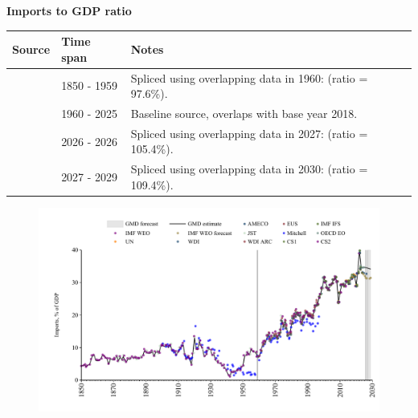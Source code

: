 \documentclass[12pt,a4paper,landscape]{article}
\begin{document}
\begin{adjustbox}{max totalsize={\paperwidth}{\paperheight},center}
\begin{minipage}[t][\textheight][t]{\textwidth}
\vspace*{0.5cm}
{}
\begin{center}
{\Large\bfseries Imports to GDP ratio}
\end{center}
\vspace{0.5cm}
\begin{table}[H]
\centering
\small
\begin{tabular}{|l|l|l|}
\hline
\textbf{Source} & \textbf{Time span} & \textbf{Notes} \\
\hline
\rowcolor{white}\cite{CS2_ESP}& 1850 - 1959 &Spliced using overlapping data in 1960: (ratio = 97.6\%). \\
\rowcolor{lightgray}\cite{OECD_EO}& 1960 - 2025 &Baseline source, overlaps with base year 2018. \\
\rowcolor{white}\cite{AMECO}& 2026 - 2026 &Spliced using overlapping data in 2027: (ratio = 105.4\%). \\
\rowcolor{lightgray}\cite{IMF_WEO_forecast}& 2027 - 2029 &Spliced using overlapping data in 2030: (ratio = 109.4\%). \\
\hline
\end{tabular}
\end{table}
\begin{figure}[H]
\centering
\includegraphics[width=\textwidth,height=0.6\textheight,keepaspectratio]{graphs/ESP_imports_GDP.pdf}
\end{figure}
\end{minipage}
\end{adjustbox}
\end{document}
